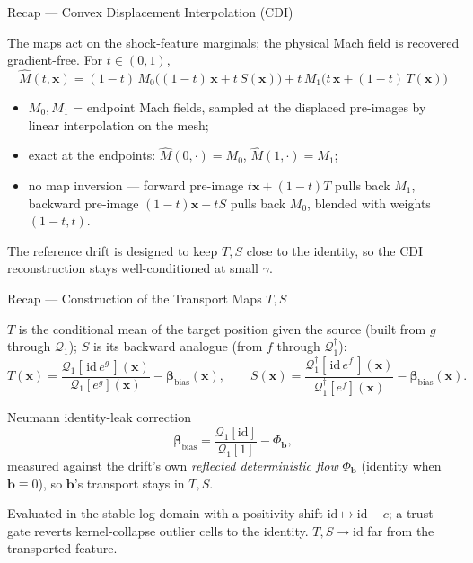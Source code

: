 \documentclass[aspectratio=169]{beamer}
\newcommand{\bt}{\mathbf{b}}
\newcommand{\xv}{\mathbf{x}}
\newcommand{\Qcal}{\mathcal{Q}}
\newcommand{\id}{\mathrm{id}}
\begin{document}
\begin{frame}{Recap — Convex Displacement Interpolation (CDI)}

The maps act on the shock-feature marginals; the physical Mach field is recovered
gradient-free. For $t\in(0,1)$,
\[
    \boxed{\;
    \widehat M(t,\xv)=(1-t)\,M_0\!\bigl((1-t)\,\xv+t\,S(\xv)\bigr)
                     +t\,M_1\!\bigl(t\,\xv+(1-t)\,T(\xv)\bigr)
    \;}
\]

\begin{itemize}
    \item $M_0,M_1$ = endpoint Mach fields, sampled at the displaced pre-images by
    linear interpolation on the mesh;
    \item exact at the endpoints: $\widehat M(0,\cdot)=M_0$, $\widehat M(1,\cdot)=M_1$;
    \item no map inversion — forward pre-image $t\xv+(1-t)T$ pulls back $M_1$,
    backward pre-image $(1-t)\xv+tS$ pulls back $M_0$, blended with weights $(1-t,t)$.
\end{itemize}

The reference drift is designed to keep $T,S$ close to the identity, so the CDI
reconstruction stays well-conditioned at small $\gamma$.

\end{frame}
\begin{frame}{Recap — Construction of the Transport Maps $T,S$}

$T$ is the conditional mean of the target position given the source (built from
$g$ through $\Qcal_1$); $S$ is its backward analogue (from $f$ through $\Qcal^{\dagger}_1$):
\[
    T(\xv)=\frac{\Qcal_1[\,\id\,e^{g}\,](\xv)}{\Qcal_1[e^{g}](\xv)}-\boldsymbol{\beta}_{\mathrm{bias}}(\xv),
    \qquad
    S(\xv)=\frac{\Qcal^{\dagger}_1[\,\id\,e^{f}\,](\xv)}{\Qcal^{\dagger}_1[e^{f}](\xv)}-\boldsymbol{\beta}_{\mathrm{bias}}(\xv).
\]

\begin{block}{Neumann identity-leak correction}
\[
    \boldsymbol{\beta}_{\mathrm{bias}}=\frac{\Qcal_1[\id]}{\Qcal_1[1]}-\Phi_{\bt},
\]
measured against the drift's own \emph{reflected deterministic flow} $\Phi_{\bt}$
(identity when $\bt\equiv0$), so $\bt$'s transport stays in $T,S$.
\end{block}

Evaluated in the stable log-domain with a positivity shift $\id\mapsto\id-c$; a
trust gate reverts kernel-collapse outlier cells to the identity. $T,S\to\id$ far
from the transported feature.

\end{frame}
\end{document}
